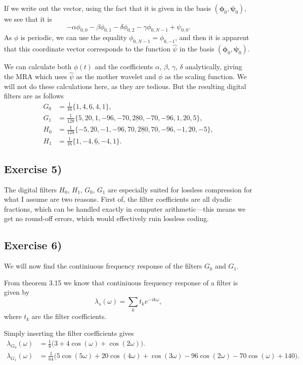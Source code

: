 \documentclass[a4paper, 11pt, notitlepage, english]{article}
\newcommand{\bt}[1]{\boldsymbol{#1}}
\begin{document}
If we write out the vector, using the fact that it is given in the basis $(\bt{\phi}_0,\bt{\psi}_0)$, we see that it is
$$-\alpha \phi_{0,0} - \beta \phi_{0,1} - \delta  \phi_{0,2} - \gamma \phi_{0,N-1} + \psi_{0,0}.$$
As $\phi$ is periodic, we can use the equality $\phi_{0,N-1} = \phi_{0,-1}$, and then it is apparent that this coordinate vector corresponds to the function $\hat{\psi}$ in the basis $(\bt{\phi}_0,\bt{\psi}_0)$.

\clearpage

We can calculate both $\phi(t)$ and the coefficients $\alpha$, $\beta$, $\gamma$, $\delta$ analytically, giving the MRA which uses $\hat{\psi}$ as the mother wavelet and $\phi$ as the scaling function. We will not do these calculations here, as they are tedious. But the resulting digital filters are as follows
\begin{align*}
    G_0 &= \frac{1}{16}\{1,4,\underline{6},4,1\}, \\
    G_1 &= \frac{1}{128}\{5,20,1,-96,-70,\underline{280},-70,-96,1,20,5\}, \\
    H_0 &= \frac{1}{128}\{-5,20,-1,-96,70,\underline{280},70,-96,-1,20,-5\}, \\
    H_1 &= \frac{1}{16}\{1,-4,\underline{6},-4,1\}.
\end{align*}

\subsection*{Exercise 5)}

The digital filters $H_0$, $H_1$, $G_0$, $G_1$ are especially suited for lossless compression for what I assume are two reasons. First of, the filter coefficients are all dyadic fractions, which can be handled exactly in computer arithmetic---this means we get no round-off errors, which would effectively ruin lossless coding.


\subsection*{Exercise 6)}

We will now find the continiuous frequency response of the filters $G_0$ and $G_1$. 

From theorem 3.15 we know that continiuous frequency response of a filter is given by
$$\lambda_s(\omega) = \sum_k t_k e^{-ik\omega},$$
where $t_k$ are the filter coefficients.

Simply inserting the filter coefficients gives
\begin{align*}    
\lambda_{G_0}(\omega) &= \frac{1}{8}\bigg(3 + 4\cos(\omega) + \cos(2\omega)\bigg).
\\
\lambda_{G_1}(\omega) &= \frac{1}{64}\bigg(5\cos(5\omega) + 20\cos(4\omega) + \cos(3\omega) - 96\cos(2\omega) - 70\cos(\omega) + 140\bigg).
\end{align*}
\end{document}
